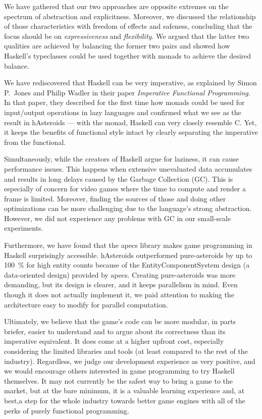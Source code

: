 \documentclass[
  digital, %
  color,   %
  table,   %
  oneside, %
  lof,     %
  lot,     %
]{fithesis3}
\begin{document}
{We have gathered that our two approaches are opposite extremes on the spectrum
of abstraction and explicitness. Moreover, we discussed the relationship of those
characteristics with freedom of effects and safeness, concluding
that the focus should be on \emph{expressiveness} and \emph{flexibility}.
We argued that the latter two qualities are achieved by balancing the former two pairs
and showed how Haskell's typeclasses could be used together with monads
to achieve the desired balance.

We have rediscovered that Haskell can be very imperative, as explained by Simon P.~Jones
and Philip Wadler in their paper \textit{Imperative Functional Programming}.\cite{imperativefp}
In that paper, they described for the first time how monads could be used for input/output
operations in lazy languages and confirmed what we see as the result in hAsteroids --- with the
 monad, Haskell can very closely resemble C. Yet, it keeps the
benefits of functional style intact by clearly separating the imperative from the functional.

Simultaneously, while the creators of Haskell argue for laziness, it can cause performance issues.
This happens when extensive unevaluated data accumulates and results in long delays caused
by the Garbage Collection (GC). This is especially of concern for video games where the time to
compute and render a frame is limited. Moreover, finding the sources of those 
and doing other optimizations can be more challenging due to the language's strong abstraction.
However, we did not experience any problems with GC in our small-scale experiments.

Furthermore, we have found that the apecs library makes game programming in Haskell surprisingly
accessible. hAsteroids outperformed pure-asteroids by up to 100~\% for high entity counts
because of the Entity\textendash{}Component\textendash{}System design (a data-oriented design)
provided by apecs.
Creating pure-asteroids was more demanding, but its design is clearer, and it keeps
parallelism in mind. Even though it does not actually implement it, we paid attention
to making the architecture easy to modify for parallel computation.

Ultimately, we believe that the game's code can be more modular, in parts briefer,
easier to understand and to argue about its correctness than its imperative equivalent.
It does come at a higher upfront cost, especially considering the limited libraries and tools
(at least compared to the rest of the industry).
Regardless, we judge our development experience as very positive, and we would encourage others
interested in game programming to try Haskell themselves.
It may not currently be the safest way to bring a game to the market,
but at the bare minimum, it is a valuable learning experience and, at best,a step for the whole industry
towards better game engines with all of the perks of purely functional programming.

}
\end{document}
